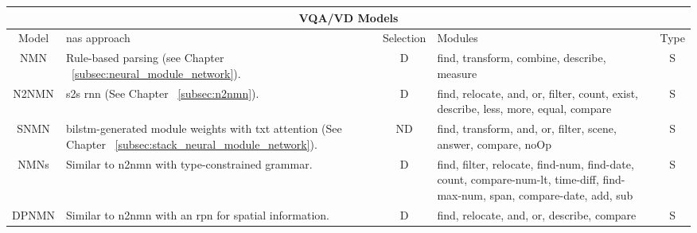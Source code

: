 \begin{table}[]
    \small
    \centering
    \begin{tabularx}{\linewidth}{cXcXc}
        \toprule
        \multicolumn{5}{c}{VQA/VD Models}                                                                                                                                                                                                                                                                     \\ \midrule
        Model                              & \gls{nas} approach                                                                                                & Selection & Modules                                                                                                                   & Type \\
        NMN                                & Rule-based parsing (see Chapter ~\ref{subsec:neural_module_network}).                                             & D         & ﬁnd, transform, combine, describe, measure                                                                                & S    \\
        N2NMN                              & \gls{s2s} \gls{rnn} (See Chapter ~\ref{subsec:n2nmn}).                                                            & D         & ﬁnd, relocate, and, or, ﬁlter, count, exist, describe, less, more, equal, compare                                         & S    \\
        SNMN                               & \gls{bilstm}-generated module weights with txt attention (See Chapter ~\ref{subsec:stack_neural_module_network}). & ND        & ﬁnd, transform, and, or, ﬁlter, scene, answer, compare, noOp                                                              & S    \\
        NMNs\pm{}\cite{chen_teaching_2022} & Similar to \gls{n2nmn} with type-constrained grammar\cite{gupta_answering_2020}.                                  & D         & find, filter, relocate, find-num, find-date, count, compare-num-lt, time-diff, find-max-num, span, compare-date, add, sub & S    \\
        DPNMN                              & Similar to \gls{n2nmn} with an \gls{rpn} for spatial information.                                                 & D         & find, relocate, and, or, describe, compare                                                                                & S    \\

\end{tabularx}
\end{table}
